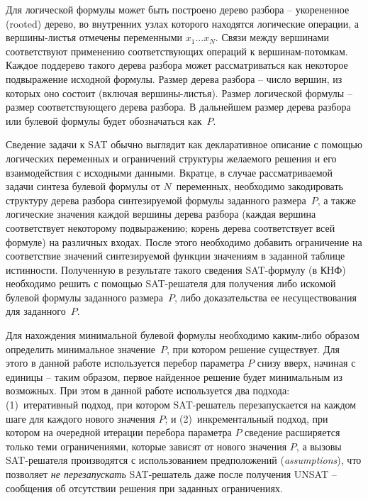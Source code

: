 Для логической формулы может быть построено дерево разбора \--- укорененное (rooted) дерево, во внутренних узлах которого находятся логические операции, а вершины-листья отмечены переменными $x_{1}\ldots x_{N}$.
Связи между вершинами соответствуют применению соответствующих операций к вершинам-потомкам.
Каждое поддерево такого дерева разбора может рассматриваться как некоторое подвыражение исходной формулы.
Размер дерева разбора \--- число вершин, из которых оно состоит (включая вершины-листья).
Размер логической формулы \--- размер соответствующего дерева разбора.
В дальнейшем размер дерева разбора или булевой формулы будет обозначаться как~$P$.

Сведение задачи к SAT обычно выглядит как декларативное описание с помощью логических переменных и ограничений структуры желаемого решения и его взаимодействия с исходными данными.
Вкратце, в случае рассматриваемой задачи синтеза булевой формулы от $N$~переменных, необходимо закодировать структуру дерева разбора синтезируемой формулы заданного размера~$P$, а также логические значения каждой вершины дерева разбора (каждая вершина соответствует некоторому подвыражению; корень дерева соответствует всей формуле) на различных входах.
После этого необходимо добавить ограничение на соответствие значений синтезируемой функции значениям в заданной таблице истинности.
Полученную в результате такого сведения SAT-формулу (в КНФ) необходимо решить с помощью SAT-решателя для получения либо искомой булевой формулы заданного размера~$P$, либо доказательства ее несуществования для заданного~$P$.

Для нахождения минимальной булевой формулы необходимо каким-либо образом определить минимальное значение~$P$, при котором решение существует.
Для этого в данной работе используется перебор параметра $P$ снизу вверх, начиная с единицы \--- таким образом, первое найденное решение будет минимальным из возможных.
При этом в данной работе используется два подхода: (1)~итеративный подход, при котором SAT-решатель перезапускается на каждом шаге для каждого нового значения $P$; и (2)~инкрементальный подход, при котором на очередной итерации перебора параметра $P$ сведение расширяется только теми ограничениями, которые зависят от нового значения $P$, а вызовы SAT-решателя производятся с использованием предположений (\textit{assumptions}), что позволяет \emph{не перезапускать} SAT-решатель даже после получения UNSAT \--- сообщения об отсутствии решения при заданных ограничениях.

